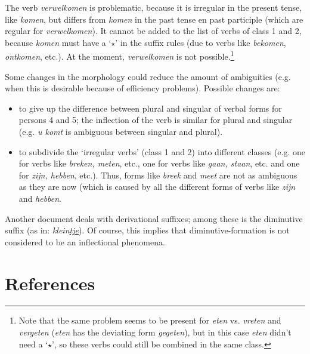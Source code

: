 The verb {\em verwelkomen} is problematic, because it is irregular in the 
present tense, like {\em komen}, but differs from {\em komen} in the past tense
en past participle (which are regular for {\em verwelkomen}). It cannot
be added to the list of verbs of class 1 and 2, because {\em komen} must have a
`$\star$' in the suffix rules (due to verbs like {\em bekomen}, {\em ontkomen},
etc.). At the moment, {\em verwelkomen} is not possible.\footnote{
Note that the same problem seems to be present for {\em eten} vs. 
{\em vreten} and
{\em vergeten} ({\em eten} has the deviating form {\em ge\underline{g}eten}),
but in this case {\em eten} didn't need a `$\star$', so these verbs could still 
be combined in the same class.}

Some changes in the morphology could reduce the amount of ambiguities (e.g.
when this is desirable because of efficiency problems). Possible changes are:
\begin{itemize}
  \item to give up the difference between plural and singular of verbal forms
        for persons 4 and 5; the inflection of the verb is similar for plural 
        and singular (e.g. {\em u komt} is ambiguous between singular and
        plural).
  \item to subdivide the `irregular verbs' (class 1 and 2) into different 
        classes (e.g. one for verbs like {\em breken, meten}, etc., one for
        verbs like {\em gaan, staan}, etc. and one for {\em zijn, hebben}, 
        etc.). Thus, forms like {\em breek} and {\em meet} are not as ambiguous 
        as they are now (which is caused by all the different forms of verbs
        like {\em zijn} and {\em hebben}.
\end{itemize} 

Another document deals with derivational suffixes; among these is the
diminutive suffix (as in: {\em klein\underline{tje}}). Of
course, this implies that diminutive-formation is not considered to be an 
inflectional phenomena.

\newpage


\section{References}

